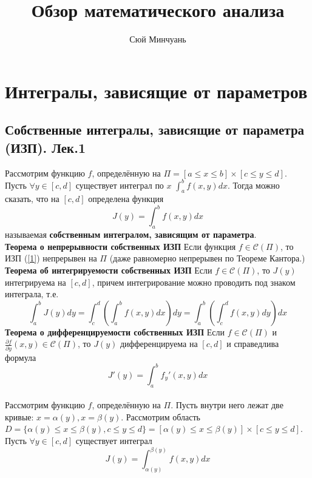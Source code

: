 \documentclass{article}
\begin{document}
\author{Сюй Минчуань}
\title{Обзор математического анализа \uppercase\expandafter{}}
\maketitle
\tableofcontents
\newpage
\section{Интегралы, зависящие от параметров}
\subsection{Собственные интегралы, зависящие от параметра (ИЗП). Лек.1}
	Рассмотрим функцию $f$, определённую на $\Pi=[a\leqslant x\leqslant b] \times[c\leqslant y\leqslant d]$. Пусть $\forall y \in[c, d]$ существует интеграл по $x$ $\int_{a}^{b} f(x,y)dx$. Тогда можно сказать, что на $[c,d]$ определена функция
	\begin{equation}
	\label{1}
	J(y)=\int_{a}^{b} f(x,y)dx
	\end{equation}
	называемая \textbf{собственным интегралом, зависящим от параметра}.\\
	\textbf{Теорема о непрерывности собственных ИЗП} Если функция $f\in \mathcal{C}(\Pi)$, то ИЗП (\ref{1}) непрерывен на $\Pi$ (даже равномерно непрерывен по Теореме Кантора.)\\
	\textbf{Теорема об интегрируемости собственных ИЗП} Если $f\in \mathcal{C}(\Pi)$, то $J(y)$ интегрируема на $[c,d]$, причем интегрирование можно проводить под знаком интеграла, т.е.
	\begin{equation}
	\label{2}
	\int_{a}^{b} J(y)dy=\int_{c}^{d}(\int_{a}^{b} f(x,y)dx)dy=\int_{a}^{b}(\int_{c}^{d} f(x,y)dy)dx
	\end{equation}
	\textbf{Теорема о дифференцируемости собственных ИЗП} Если $f\in \mathcal{C}(\Pi)$ и $\frac{\partial{f}}{\partial{y}}(x,y)\in \mathcal{C}(\Pi)$, то $J(y)$ дифференцируема на $[c,d]$ и справедлива формула
	\begin{equation}
	\label{3}
	J'(y)=\int_{a}^{b} {f}_{y}'(x,y)dx
	\end{equation}
	\\
	Рассмотрим функцию $f$, определённую на $\Pi$. Пусть внутри него лежат две кривые: $x=\alpha(y), x=\beta(y)$. Рассмотрим область $D=\{\alpha(y)\le x \le \beta(y),c\le y\le d\}=[\alpha(y)\le x \le \beta(y)]\times[c\le y\le d]$. Пусть $\forall y \in[c, d]$ существует интеграл 
	\begin{equation}
	\label{4}
	J(y)=\int_{\alpha(y)}^{\beta(y)} f(x,y)dx
	\end{equation}
\end{document}
